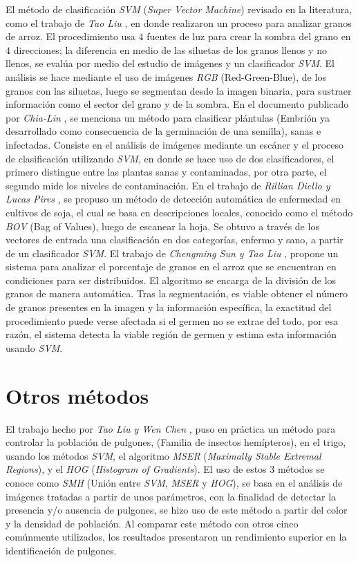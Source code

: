 El método de clasificación \textit{SVM} (\textit{Super Vector Machine}) revisado en la literatura, como el trabajo de \textit{Tao Liu} \cite{LIU201679}, en donde realizaron un proceso para analizar granos de arroz. El procedimiento usa $4$ fuentes de luz para crear la sombra del grano en $4$ direcciones; la diferencia en medio de las siluetas de los granos llenos y no llenos, se evalúa por medio del estudio de imágenes y un clasificador \textit{SVM}. El análisis se hace mediante el uso de imágenes \textit{RGB} (Red-Green-Blue), de los granos con las siluetas, luego se segmentan desde la imagen binaria, para sustraer información como el sector del grano y de la sombra. En el documento publicado por \textit{Chia-Lin} \cite{CHUNG2016404}, se menciona un método para clasificar plántulas (Embrión ya desarrollado como consecuencia de la germinación de una semilla), sanas e infectadas. Consiste en el análisis de imágenes mediante un escáner y el proceso de clasificación utilizando \textit{SVM}, en donde se hace uso de dos clasificadores, el primero distingue entre las plantas sanas y contaminadas, por otra parte, el segundo mide los niveles de contaminación. En el trabajo de \textit{Rillian Diello y Lucas Pires} \cite{PIRES201648}, se propuso un método de detección automática de enfermedad en cultivos de soja, el cual se basa en descripciones locales, conocido como el método \textit{BOV} (Bag of Values), luego de escanear la hoja. Se obtuvo a través de los vectores de entrada una clasificación en dos categorías, enfermo y sano, a partir de un clasificador \textit{SVM}. El trabajo de \textit{Chengming Sun y Tao Liu} \cite{SUN2014426}, propone un sistema para analizar el porcentaje de granos en el arroz que se encuentran en condiciones para ser distribuidos. El algoritmo se encarga de la división de los granos de manera automática. Tras la segmentación, es viable obtener el número de granos presentes en la imagen y la información específica, la exactitud del procedimiento puede verse afectada si el germen no se extrae del todo, por esa razón, el sistema detecta la viable región de germen y estima esta información usando \textit{SVM}.\\

\section{Otros métodos}

El trabajo hecho por \textit{Tao Liu y Wen Chen} \cite{LIU201682}, puso en práctica un método para controlar la población de pulgones, (Familia de insectos hemípteros), en el trigo, usando los métodos \textit{SVM}, el algoritmo \textit{MSER} (\textit{Maximally Stable Extremal Regions}), y el \textit{HOG} (\textit{Histogram of Gradients}). El uso de estos 3 métodos se conoce como \textit{SMH} (Unión entre \textit{SVM}, \textit{MSER} y \textit{HOG}), se basa en el análisis de imágenes tratadas a partir de unos parámetros, con la finalidad de detectar la presencia y/o ausencia de pulgones, se hizo uso de este método a partir del color y la densidad de población. Al comparar este método con otros cinco comúnmente utilizados, los resultados presentaron un rendimiento superior en la identificación de pulgones. \\

